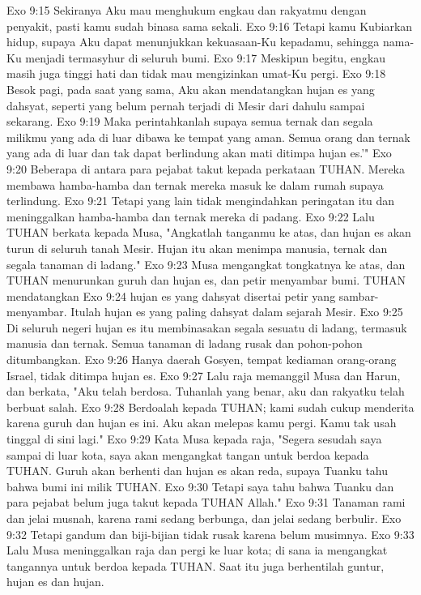 Exo 9:15  Sekiranya Aku mau menghukum engkau dan rakyatmu dengan penyakit, pasti kamu sudah binasa sama sekali.
Exo 9:16  Tetapi kamu Kubiarkan hidup, supaya Aku dapat menunjukkan kekuasaan-Ku kepadamu, sehingga nama-Ku menjadi termasyhur di seluruh bumi.
Exo 9:17  Meskipun begitu, engkau masih juga tinggi hati dan tidak mau mengizinkan umat-Ku pergi.
Exo 9:18  Besok pagi, pada saat yang sama, Aku akan mendatangkan hujan es yang dahsyat, seperti yang belum pernah terjadi di Mesir dari dahulu sampai sekarang.
Exo 9:19  Maka perintahkanlah supaya semua ternak dan segala milikmu yang ada di luar dibawa ke tempat yang aman. Semua orang dan ternak yang ada di luar dan tak dapat berlindung akan mati ditimpa hujan es.'"
Exo 9:20  Beberapa di antara para pejabat takut kepada perkataan TUHAN. Mereka membawa hamba-hamba dan ternak mereka masuk ke dalam rumah supaya terlindung.
Exo 9:21  Tetapi yang lain tidak mengindahkan peringatan itu dan meninggalkan hamba-hamba dan ternak mereka di padang.
Exo 9:22  Lalu TUHAN berkata kepada Musa, "Angkatlah tanganmu ke atas, dan hujan es akan turun di seluruh tanah Mesir. Hujan itu akan menimpa manusia, ternak dan segala tanaman di ladang."
Exo 9:23  Musa mengangkat tongkatnya ke atas, dan TUHAN menurunkan guruh dan hujan es, dan petir menyambar bumi. TUHAN mendatangkan
Exo 9:24  hujan es yang dahsyat disertai petir yang sambar-menyambar. Itulah hujan es yang paling dahsyat dalam sejarah Mesir.
Exo 9:25  Di seluruh negeri hujan es itu membinasakan segala sesuatu di ladang, termasuk manusia dan ternak. Semua tanaman di ladang rusak dan pohon-pohon ditumbangkan.
Exo 9:26  Hanya daerah Gosyen, tempat kediaman orang-orang Israel, tidak ditimpa hujan es.
Exo 9:27  Lalu raja memanggil Musa dan Harun, dan berkata, "Aku telah berdosa. Tuhanlah yang benar, aku dan rakyatku telah berbuat salah.
Exo 9:28  Berdoalah kepada TUHAN; kami sudah cukup menderita karena guruh dan hujan es ini. Aku akan melepas kamu pergi. Kamu tak usah tinggal di sini lagi."
Exo 9:29  Kata Musa kepada raja, "Segera sesudah saya sampai di luar kota, saya akan mengangkat tangan untuk berdoa kepada TUHAN. Guruh akan berhenti dan hujan es akan reda, supaya Tuanku tahu bahwa bumi ini milik TUHAN.
Exo 9:30  Tetapi saya tahu bahwa Tuanku dan para pejabat belum juga takut kepada TUHAN Allah."
Exo 9:31  Tanaman rami dan jelai musnah, karena rami sedang berbunga, dan jelai sedang berbulir.
Exo 9:32  Tetapi gandum dan biji-bijian tidak rusak karena belum musimnya.
Exo 9:33  Lalu Musa meninggalkan raja dan pergi ke luar kota; di sana ia mengangkat tangannya untuk berdoa kepada TUHAN. Saat itu juga berhentilah guntur, hujan es dan hujan.
